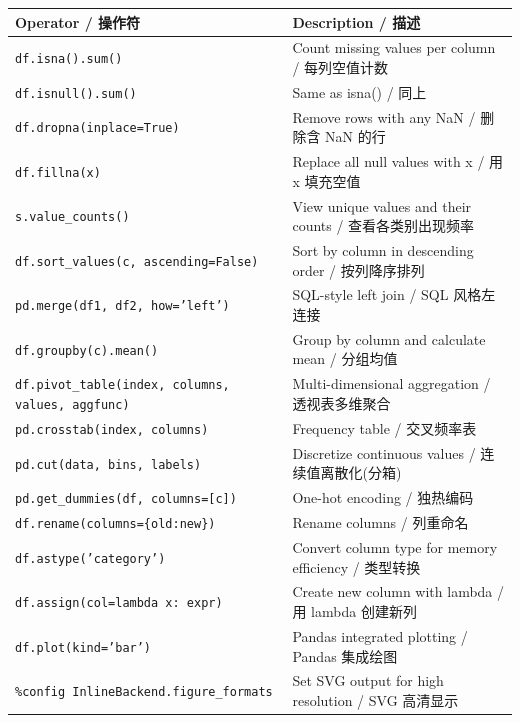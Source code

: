 \documentclass[11pt,a4paper]{article}
\begin{document}
\begin{table}[h]
\centering
\small
\renewcommand{\arraystretch}{1.3}
\begin{tabular}{@{}ll@{}}
\toprule
\textbf{Operator / 操作符} & \textbf{Description / 描述} \\ \midrule
\texttt{df.isna().sum()} & Count missing values per column / 每列空值计数 \\
\texttt{df.isnull().sum()} & Same as isna() / 同上 \\
\texttt{df.dropna(inplace=True)} & Remove rows with any NaN / 删除含 NaN 的行 \\
\texttt{df.fillna(x)} & Replace all null values with x / 用 x 填充空值 \\
\texttt{s.value\_counts()} & View unique values and their counts / 查看各类别出现频率 \\
\texttt{df.sort\_values(c, ascending=False)} & Sort by column in descending order / 按列降序排列 \\
\texttt{pd.merge(df1, df2, how='left')} & SQL-style left join / SQL 风格左连接 \\
\texttt{df.groupby(c).mean()} & Group by column and calculate mean / 分组均值 \\
\texttt{df.pivot\_table(index, columns, values, aggfunc)} & Multi-dimensional aggregation / 透视表多维聚合 \\
\texttt{pd.crosstab(index, columns)} & Frequency table / 交叉频率表 \\
\texttt{pd.cut(data, bins, labels)} & Discretize continuous values / 连续值离散化(分箱) \\
\texttt{pd.get\_dummies(df, columns=[c])} & One-hot encoding / 独热编码 \\
\texttt{df.rename(columns=\{old:new\})} & Rename columns / 列重命名 \\
\texttt{df.astype('category')} & Convert column type for memory efficiency / 类型转换 \\
\texttt{df.assign(col=lambda x: expr)} & Create new column with lambda / 用 lambda 创建新列 \\
\texttt{df.plot(kind='bar')} & Pandas integrated plotting / Pandas 集成绘图 \\
\texttt{\%config InlineBackend.figure\_formats} & Set SVG output for high resolution / SVG 高清显示 \\ \bottomrule
\end{tabular}
\end{table}
\end{document}
